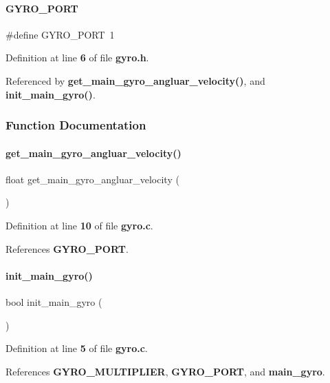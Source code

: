 \paragraph{G\+Y\+R\+O\+\_\+\+P\+O\+RT}
{\footnotesize\ttfamily \#define G\+Y\+R\+O\+\_\+\+P\+O\+RT~1}



Definition at line \textbf{ 6} of file \textbf{ gyro.\+h}.



Referenced by \textbf{ get\+\_\+main\+\_\+gyro\+\_\+angluar\+\_\+velocity()}, and \textbf{ init\+\_\+main\+\_\+gyro()}.



\subsubsection{Function Documentation}
\mbox{\label{gyro_8h_aec0963ebe3eb6cdfd7edaf486bbb0a87}} 
\paragraph{get\+\_\+main\+\_\+gyro\+\_\+angluar\+\_\+velocity()}
{\footnotesize\ttfamily float get\+\_\+main\+\_\+gyro\+\_\+angluar\+\_\+velocity (\begin{DoxyParamCaption}{ }\end{DoxyParamCaption})}



Definition at line \textbf{ 10} of file \textbf{ gyro.\+c}.



References \textbf{ G\+Y\+R\+O\+\_\+\+P\+O\+RT}.

\mbox{\label{gyro_8h_a47c0a78a867be91a28e278bf433d699c}} 
\paragraph{init\+\_\+main\+\_\+gyro()}
{\footnotesize\ttfamily bool init\+\_\+main\+\_\+gyro (\begin{DoxyParamCaption}{ }\end{DoxyParamCaption})}



Definition at line \textbf{ 5} of file \textbf{ gyro.\+c}.



References \textbf{ G\+Y\+R\+O\+\_\+\+M\+U\+L\+T\+I\+P\+L\+I\+ER}, \textbf{ G\+Y\+R\+O\+\_\+\+P\+O\+RT}, and \textbf{ main\+\_\+gyro}.

